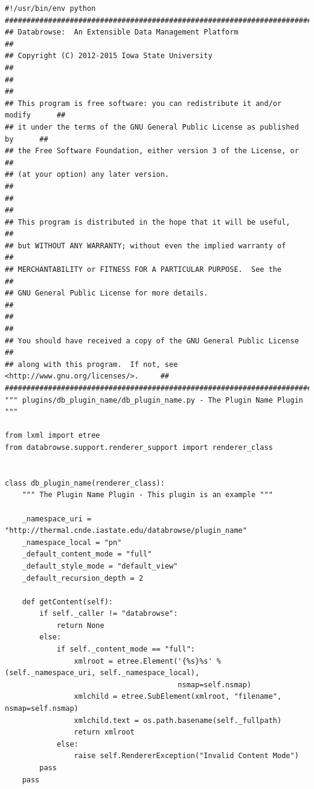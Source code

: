 \documentclass[10pt]{article}
\begin{document}
\clearpage
\begin{lstlisting}
#!/usr/bin/env python
###############################################################################
## Databrowse:  An Extensible Data Management Platform                       ##
## Copyright (C) 2012-2015 Iowa State University                             ##
##                                                                           ##
## This program is free software: you can redistribute it and/or modify      ##
## it under the terms of the GNU General Public License as published by      ##
## the Free Software Foundation, either version 3 of the License, or         ##
## (at your option) any later version.                                       ##
##                                                                           ##
## This program is distributed in the hope that it will be useful,           ##
## but WITHOUT ANY WARRANTY; without even the implied warranty of            ##
## MERCHANTABILITY or FITNESS FOR A PARTICULAR PURPOSE.  See the             ##
## GNU General Public License for more details.                              ##
##                                                                           ##
## You should have received a copy of the GNU General Public License         ##
## along with this program.  If not, see <http://www.gnu.org/licenses/>.     ##
###############################################################################
""" plugins/db_plugin_name/db_plugin_name.py - The Plugin Name Plugin """

from lxml import etree
from databrowse.support.renderer_support import renderer_class


class db_plugin_name(renderer_class):
    """ The Plugin Name Plugin - This plugin is an example """

    _namespace_uri = "http://thermal.cnde.iastate.edu/databrowse/plugin_name"
    _namespace_local = "pn"
    _default_content_mode = "full"
    _default_style_mode = "default_view"
    _default_recursion_depth = 2

    def getContent(self):
        if self._caller != "databrowse":
            return None
        else:
            if self._content_mode == "full":
                xmlroot = etree.Element('{%s}%s' % (self._namespace_uri, self._namespace_local),
                                        nsmap=self.nsmap)
                xmlchild = etree.SubElement(xmlroot, "filename", nsmap=self.nsmap)
                xmlchild.text = os.path.basename(self._fullpath)
                return xmlroot
            else:
                raise self.RendererException("Invalid Content Mode")
        pass
    pass

\end{lstlisting}
\end{document}
